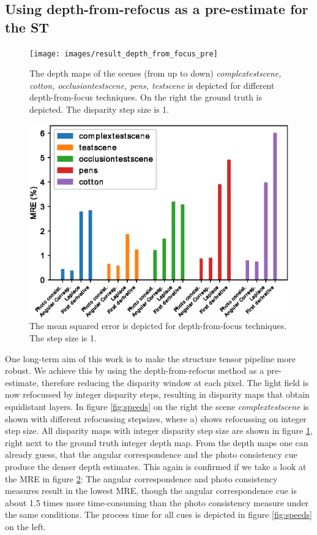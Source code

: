 \documentclass  [
  paper    = a4,
  BCOR     = 10mm,
  twoside,
  fontsize = 12pt,
  fleqn,
  toc      = bibnumbered,
  toc      = listofnumbered,
  numbers  = noendperiod,
  headings = normal,
  listof   = leveldown,
  version  = 3.03
]                                       {scrreprt}
\begin{document}
	\subsection{Using depth-from-refocus as a pre-estimate for the ST}
		\begin{figure}[h!]
		\centering
		\texttt{[image: images/result\_depth\_from\_focus\_pre]}
		\caption[Depth from focus: depth maps with resolution 1]{The depth maps of the scenes (from up to down) \textit{complextestscene, cotton, occlusiontestscene, pens, testscene} is depicted for different depth-from-focus techniques. On the right the ground truth is depicted. The disparity step size is 1.}
		\label{fig:resultdepthfromfocuspre}
	\end{figure}
	\begin{figure}[h!]
	\centering
	\includegraphics[width=0.7\linewidth]{images/error_res1_all}
	\caption[Mean squared error for depth-from-focus techniques]{The mean squared error is depicted for depth-from-focus techniques. The step size is 1.}
	\label{fig:errorres1all}
	\end{figure}
	One long-term aim of this work is to make the structure tensor pipeline more robust. We achieve this by using the depth-from-refocus method as a pre-estimate, therefore reducing the disparity window at each pixel. The light field is now refocussed by integer disparity steps, resulting in disparity maps that obtain equidistant layers. In figure \ref{fig:speeds} on the right the scene \textit{complextestscene} is shown with different refocussing stepsizes, where a) shows refocussing on integer step size.
	 All disparity maps with integer disparity step size are shown in figure \ref{fig:resultdepthfromfocuspre}, right next to the ground truth integer depth map. From the depth maps one can already guess, that the angular correspondence and the photo consistency cue produce the denser depth estimates.  This again is confirmed if we take a look at the MRE in figure \ref{fig:errorres1all}: The angular correspondence and photo consistency measures result in the lowest MRE, though the angular correspondence cue is about 1.5 times more time-consuming than the photo consistency measure under the same conditions. The process time for all cues is depicted in figure \ref{fig:speeds} on the left.
\end{document}
